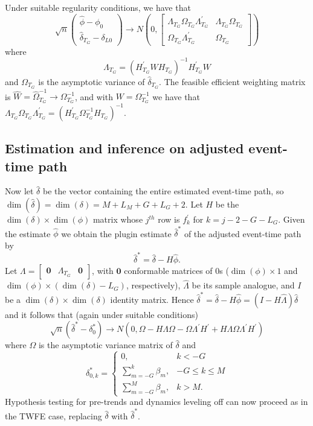 \documentclass[12pt]{article}
\begin{document}
Under suitable regularity conditions, we have that
\[
\sqrt{n}\left(\begin{array}{c}
\widehat{\phi}-\phi_{0}\\
\widehat{\delta}_{T_G}-\delta_{L0}
\end{array}\right)\to N\left(0,\begin{bmatrix}\Lambda_{T_G}\Omega_{T_G}\Lambda_{T_G}^{\prime} & \Lambda_{T_G}\Omega_{T_G}\\
\Omega_{T_G}\Lambda_{T_G}^{\prime} & \Omega_{T_G}
\end{bmatrix}\right)
\]
where
\[
\Lambda_{T_G}=(H_{T_G}^{\prime}WH_{T_G})^{-1}H_{T_G}^{\prime}W
\]
and $\Omega_{T_G}$ is the asymptotic variance of $\widehat{\delta}_{T_G}$.
The feasible efficient weighting matrix is $\widehat{W}=\widehat{\Omega}_{T_G}^{-1}\to\Omega_{T_G}^{-1}$,
and with $W=\Omega_{T_G}^{-1}$ we have that $\Lambda_{T_G}\Omega_{T_G}\Lambda_{T_G}^{\prime}=(H_{T_G}^{\prime}\Omega_{T_G}^{-1}H_{T_G})^{-1}.$

\subsection{Estimation and inference on adjusted event-time path}

Now let $\widehat{\delta}$ be the vector containing the entire estimated
event-time path, so $\dim\left(\widehat{\delta}\right)=\dim\left(\delta\right)=M+L_{M}+G+L_{G}+2$.
Let $H$ be the $\dim\left(\delta\right)\times\dim\left(\phi\right)$
matrix whose $j^{th}$ row is $f_{k}^{'}$ for $k=j-2-G-L_{G}$. Given
the estimate $\widehat{\phi}$ we obtain the plugin estimate $\widehat{\delta}^{*}$
of the adjusted event-time path by
\[
\widehat{\delta}^{*}=\widehat{\delta}-H\widehat{\phi}.
\]
Let $\Lambda=\begin{bmatrix}\boldsymbol{0} & \Lambda_{T_G} & \boldsymbol{0}\end{bmatrix}$,
with $\boldsymbol{0}$ conformable matrices of 0s ($\dim\left(\phi\right)\times1$
and $\dim\left(\phi\right)\times\left(\dim\left(\delta\right)-L_{G}\right)$,
respectively), $\widehat{\Lambda}$ be its sample analogue, and $I$
be a $\dim\left(\delta\right)\times\dim\left(\delta\right)$ identity
matrix. Hence $\widehat{\delta}^{*}=\widehat{\delta}-H\widehat{\phi}=\left(I-H\widehat{\Lambda}\right)\widehat{\delta}$
and it follows that (again under suitable conditions)
\[
\sqrt{n}\left(\widehat{\delta}^{*}-\delta_{0}^{*}\right)\to N\left(0,\Omega-H\Lambda\Omega-\Omega\Lambda^{\prime}H^{\prime}+H\Lambda\Omega\Lambda^{\prime}H^{\prime}\right)
\]
where $\Omega$ is the asymptotic variance matrix of $\hat{\delta}$ and
\[
\delta_{0,k}^{*}=\begin{cases}
0, & k<-G\\
\sum_{m=-G}^{k}\beta_{m}, & -G\le k\le M\\
\sum_{m=-G}^{M}\beta_{m}, & k>M.
\end{cases}
\]
Hypothesis testing for pre-trends and dynamics leveling off can
now proceed as in the TWFE case, replacing $\widehat{\delta}$ with
$\widehat{\delta}^{*}$.
\end{document}
